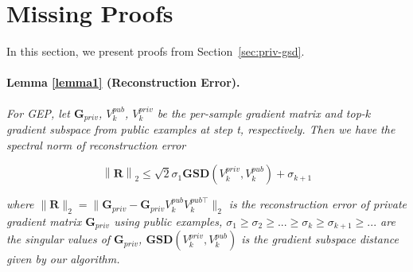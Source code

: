 \documentclass[11pt]{article}
\begin{document}


\vspace{10cm}
\section{Missing Proofs}
\label{proofs}
In this section, we present proofs from Section~\ref{sec:priv-gsd}.

\iffalse
\paragraph{Lemma \ref{lemma1} (Reconstruction Error).} \textit{For GEP\cite{donot}, let $\mathbf{G}_{p r i v}$, $V_k^{p u b}$, $V_k^{priv}$ be the per-sample gradient matrix and top-$k$ gradient subspace from public examples at step t, respectively. Then we have the spectral norm of reconstruction error}

\begin{equation}
    \left\| \mathbf{R} \right\|_2 \le \sqrt{2}\sigma_{1}\mathbf{GSD}(V_k^{priv}, V_k^{p u b}) + \sigma_{k + 1}
\end{equation}

\textit{where $\|\mathbf{R}\|_2 = \|\mathbf{G}_{p r i v}-\mathbf{G}_{p r i v} V_k^{p u b} V_k^{p u b \top} \|_2$ is the reconstruction error of private gradient matrix $\mathbf{G}_{p r i v}$ using public examples, $\sigma_1 \ge \sigma_2 \ge ...\ge \sigma_k \ge \sigma_{k + 1} \ge...$ are the singular values of $\mathbf{G}_{p r i v}$, $\mathbf{GSD}(V_k^{priv}, V_k^{p u b})$ is the gradient subspace distance given by our algorithm.}
\end{document}
